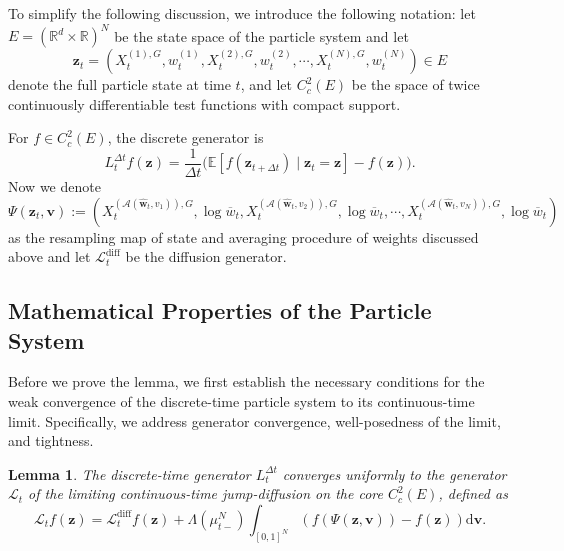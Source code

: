 \documentclass{article}
\newcommand{\mathbbm}[1]{\boldsymbol{#1}}
\theoremstyle{plain}
\newtheorem{lemma}[theorem]{Lemma}
\theoremstyle{definition}
\theoremstyle{remark}
\newcommand{\R}{{\mathbb{R}}}
\begin{document}
To simplify the following discussion, we introduce the following notation: let \(E = (\R^d \times \R)^N\) be the state space of the particle system and let
\[
    \mathbbm{z}_t=\left(X^{(1),G}_t,w_t^{(1)},X^{(2),G}_t,w_t^{(2)},\cdots, X^{(N),G}_t,w_t^{(N)}\right) \in E 
\] denote the full particle state at time \(t\), and let \(C_c^2(E)\) be the space of twice continuously differentiable test functions with compact support. 



For \(f\in C_c^2(E)\), the discrete generator is
\[
L^{\Delta t}_t f(\mathbbm{z}) = \frac{1}{\Delta t}\big( \mathbb{E}[f(\mathbbm{z}_{t+\Delta t}) \mid \mathbbm{z}_t=\mathbbm{z}] - f(\mathbbm{z}) \big).
\]
Now we denote
\[
    \Psi(\mathbbm{z}_t,\mathbbm{v}):=(X_{t}^{(\mathcal{A}(\mathbbm{\widehat  w}_{t},v_1)),G}, \log \overline w_t, X_{t}^{(\mathcal{A}(\mathbbm{\widehat  w}_{t},v_2)),G}, \log \overline w_t, \cdots, X_{t}^{(\mathcal{A}(\mathbbm{\widehat  w}_{t},v_N)),G}, \log \overline w_t)
\] as the resampling map of state and averaging procedure of weights discussed above and let \(\mathcal{L}^{\mathrm{diff}}_t\) be the diffusion generator.

\subsection{Mathematical Properties of the Particle System}

Before we prove the lemma, we first establish the necessary conditions for the weak convergence of the discrete-time particle system to its continuous-time limit. Specifically, we address generator convergence, well-posedness of the limit, and tightness. 

\begin{lemma}
The discrete-time generator $L^{\Delta t}_t$ converges uniformly to the generator $\mathcal{L}_t$ of the limiting continuous-time jump-diffusion on the core $C_c^2(E)$, defined as 
\begin{equation*}
    \mathcal{L}_t f(\mathbbm{z}) = \mathcal{L}^{\text{diff}}_t f(\mathbbm{z}) + \Lambda(\mu^N_{t-}) \int_{[0,1]^N} \left( f(\Psi(\mathbbm{z}, \mathbbm{v})) - f(\mathbbm{z}) \right)  \mathrm{d}\mathbbm{v}.
\end{equation*}
\label{lem:convergence_of_discrete_time_generator}
\end{lemma}
\end{document}
